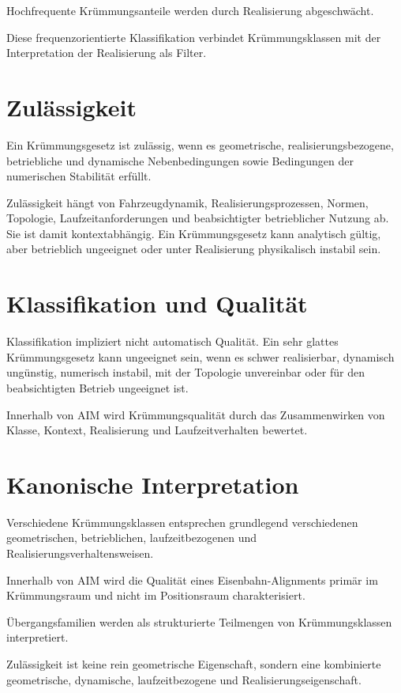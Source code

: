 \begin{proposition}
\label{prop:curvature-classes-spectral-realization}
Hochfrequente Krümmungsanteile werden durch Realisierung abgeschwächt.
\end{proposition}
Diese frequenzorientierte Klassifikation verbindet Krümmungsklassen mit der
Interpretation der Realisierung als Filter.

\section{Zulässigkeit}

\begin{definition}
\label{def:admissible-curvature-law}
Ein Krümmungsgesetz ist zulässig, wenn es geometrische,
realisierungsbezogene, betriebliche und dynamische Nebenbedingungen sowie
Bedingungen der numerischen Stabilität erfüllt.
\end{definition}

Zulässigkeit hängt von Fahrzeugdynamik, Realisierungsprozessen, Normen,
Topologie, Laufzeitanforderungen und beabsichtigter betrieblicher Nutzung ab.
Sie ist damit kontextabhängig. Ein Krümmungsgesetz kann analytisch gültig,
aber betrieblich ungeeignet oder unter Realisierung physikalisch instabil sein.

\section{Klassifikation und Qualität}

Klassifikation impliziert nicht automatisch Qualität. Ein sehr glattes
Krümmungsgesetz kann ungeeignet sein, wenn es schwer realisierbar, dynamisch
ungünstig, numerisch instabil, mit der Topologie unvereinbar oder für den
beabsichtigten Betrieb ungeeignet ist.

Innerhalb von AIM wird Krümmungsqualität durch das Zusammenwirken von Klasse,
Kontext, Realisierung und Laufzeitverhalten bewertet.

\section{Kanonische Interpretation}

\begin{proposition}
Verschiedene Krümmungsklassen entsprechen grundlegend verschiedenen
geometrischen, betrieblichen, laufzeitbezogenen und
Realisierungsverhaltensweisen.
\end{proposition}
\begin{proposition}
Innerhalb von AIM wird die Qualität eines Eisenbahn-Alignments primär im
Krümmungsraum und nicht im Positionsraum charakterisiert.
\end{proposition}
\begin{proposition}
Übergangsfamilien werden als strukturierte Teilmengen von Krümmungsklassen
interpretiert.
\end{proposition}
\begin{proposition}
Zulässigkeit ist keine rein geometrische Eigenschaft, sondern eine kombinierte
geometrische, dynamische, laufzeitbezogene und Realisierungseigenschaft.
\end{proposition}

